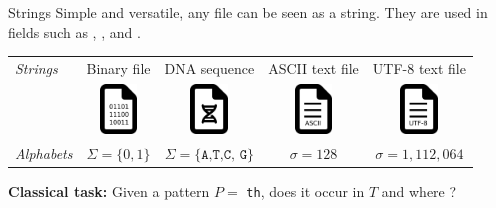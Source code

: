 \begin{frame}{Strings}
    Simple and versatile, any file can be seen as a string.
    They are used in fields such as , , and .

    \medskip
    \begin{tabular}{l  c c c c}
        \emph{Strings} & Binary file & DNA sequence & ASCII text file & UTF-8 text file \\
        \rule{0pt}{10ex}    
        &
        \includegraphics[width=1cm]{pictures/file-bin.png}&
        \includegraphics[width=1cm]{pictures/file-dna.png}&
        \includegraphics[width=1cm]{pictures/file-ascii.png}&
        \includegraphics[width=1cm]{pictures/file-utf-8.png}
        \\
        \rule{0pt}{4ex}  
        \emph{Alphabets} & $\Sigma=\{0,1\}$ & $\Sigma=\{\texttt{A,T,C, G}\}$ & $\sigma=128$ & $\sigma = 1,112,064$\\
    \end{tabular}
    \bigskip

    \textbf{Classical task:} Given a pattern $P =$ \texttt{th}, does it occur in  $T$ and where ?
    
    \begin{center}
        \\
    \end{center}

\end{frame}


